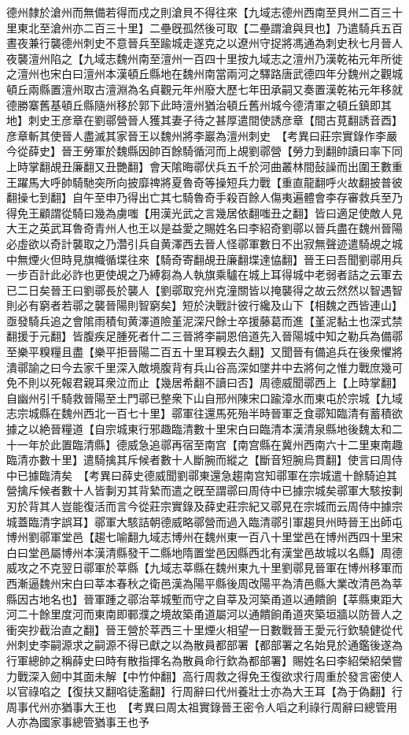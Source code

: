 德州隸於滄州而無備若得而戍之則滄貝不得往來【九域志德州西南至貝州二百三十里東北至滄州亦二百三十里】二壘旣孤然後可取【二壘謂滄與貝也】乃遣騎兵五百晝夜兼行襲德州刺史不意晉兵至踰城走遂克之以遼州守捉將馮通為刺史秋七月晉人夜襲澶州陷之【九域志魏州南至澶州一百四十里按九域志之澶州乃漢乾祐元年所徙之澶州也宋白曰澶州本漢頓丘縣地在魏州南當兩河之驛路唐武德四年分魏州之觀城頓丘兩縣置澶州取古澶淵為名貞觀元年州廢大歷七年田承嗣又奏置漢乾祐元年移就德勝寨舊基頓丘縣隨州移於郭下此時澶州猶治頓丘舊州城今德清軍之頓丘鎮即其地】刺史王彦章在劉鄩營晉人獲其妻子待之甚厚遣間使誘彦章【間古莧翻誘音酉】彦章斬其使晉人盡滅其家晉王以魏州將李巖為澶州刺史　【考異曰莊宗實錄作李嚴今從薛史】晉王勞軍於魏縣因帥百餘騎循河而上覘劉鄩營【勞力到翻帥讀曰率下同上時掌翻覘丑廉翻又丑艷翻】會天隂晦鄩伏兵五千於河曲叢林間鼔譟而出圍王數重王躍馬大呼帥騎馳突所向披靡禆將夏魯奇等操短兵力戰【重直龍翻呼火故翻披普彼翻操七到翻】自午至申乃得出亡其七騎魯奇手殺百餘人傷夷遍體會李存審救兵至乃得免王顧謂從騎曰幾為虜嗤【用漢光武之言幾居依翻嗤丑之翻】皆曰適足使敵人見大王之英武耳魯奇青州人也王以是益愛之賜姓名曰李紹奇劉鄩以晉兵盡在魏州晉陽必虛欲以奇計襲取之乃濳引兵自黄澤西去晉人怪鄩軍數日不出寂無聲迹遣騎覘之城中無煙火但時見旗幟循堞往來【騎奇寄翻覘丑廉翻堞達恊翻】晉王曰吾聞劉鄩用兵一步百計此必詐也更使覘之乃縛芻為人執旗乘驢在城上耳得城中老弱者詰之云軍去已二日矣晉王曰劉鄩長於襲人【劉鄩取兖州克潼關皆以掩襲得之故云然然以智遇智則必有窮者若鄩之襲晉陽則智窮矣】短於決戰計彼行纔及山下【相魏之西皆連山】亟發騎兵追之會隂雨積旬黄澤道險堇泥深尺餘士卒援藤葛而進【堇泥黏土也深式禁翻援于元翻】皆腹疾足腫死者什二三晉將李嗣恩倍道先入晉陽城中知之勒兵為備鄩至樂平糗糧且盡【樂平拒晉陽二百五十里耳糗去久翻】又聞晉有備追兵在後衆懼將潰鄩諭之曰今去家千里深入敵境腹背有兵山谷高深如墜井中去將何之惟力戰庶幾可免不則以死報君親耳衆泣而止【幾居希翻不讀曰否】周德威聞鄩西上【上時掌翻】自幽州引千騎救晉陽至土門鄩已整衆下山自邢州陳宋口踰漳水而東屯於宗城【九域志宗城縣在魏州西北一百七十里】鄩軍往還馬死殆半時晉軍乏食鄩知臨清有蓄積欲據之以絶晉糧道【自宗城東行邪趣臨清數十里宋白曰臨清本漢清泉縣地後魏太和二十一年於此置臨清縣】德威急追鄩再宿至南宫【南宫縣在冀州西南六十二里東南趣臨清亦數十里】遣騎擒其斥候者數十人斷腕而縱之【斷音短腕烏貫翻】使言曰周侍中已據臨清矣　【考異曰薛史德威聞劉鄩東還急趨南宫知鄩軍在宗城遣十餘騎迫其營擒斥候者數十人皆剚刃其背縶而遣之旣至謂鄩曰周侍中已據宗城矣鄩軍大駭按剚刃於背其人豈能復活而言今從莊宗實錄及薛史莊宗紀又鄩見在宗城而云周侍中據宗城蓋臨清字誤耳】鄩軍大駭詰朝德威略鄩營而過入臨清鄩引軍趨貝州時晉王出師屯博州劉鄩軍堂邑【趨七喻翻九域志博州在魏州東一百八十里堂邑在博州西四十里宋白曰堂邑屬博州本漢清縣發干二縣地隋置堂邑因縣西北有漢堂邑故城以名縣】周德威攻之不克翌日鄩軍於莘縣【九域志莘縣在魏州東九十里劉鄩見晉軍在博州移軍而西漸逼魏州宋白曰莘本春秋之衛邑漢為陽平縣後周改陽平為清邑縣大業改清邑為莘縣因古地名也】晉軍踵之鄩治莘城塹而守之自莘及河築甬道以通饋餉【莘縣東距大河二十餘里度河而東南即鄆濮之境故築甬道屬河以通饋餉甬道夾築垣牆以防晉人之衝突抄截治直之翻】晉王營於莘西三十里煙火相望一日數戰晉王愛元行欽驍健從代州刺史李嗣源求之嗣源不得已獻之以為散員都部署【都部署之名始見於通鑑後遂為行軍總帥之稱薛史曰時有散指揮名為散員命行欽為都部署】賜姓名曰李紹榮紹榮嘗力戰深入劒中其面未解【中竹仲翻】高行周救之得免王復欲求行周重於發言密使人以官祿啗之【復扶又翻啗徒濫翻】行周辭曰代州養壯士亦為大王耳【為于偽翻】行周事代州亦猶事大王也　【考異曰周太祖實錄晉王密令人㗖之利祿行周辭曰總管用人亦為國家事總管猶事王也予
